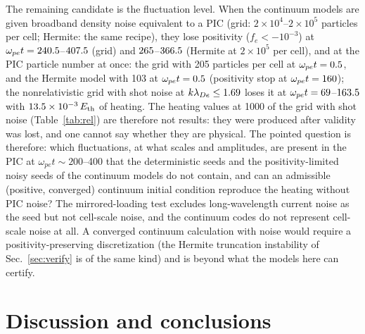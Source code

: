 \documentclass[aps,pre,reprint,floatfix,amsmath,amssymb,nofootinbib,superscriptaddress]{revtex4-2}
\newcommand{\wpe}{\omega_{pe}}
\begin{document}
The remaining candidate is the fluctuation level. When the continuum models are given broadband density noise equivalent to a PIC (grid: $2\times10^4$--$2\times10^5$ particles per cell; Hermite: the same recipe), they lose positivity ($f_e<-10^{-3}$) at $\wpe t=\shotFnegLo$--$407.5$ (grid) and $265$--$366.5$ (Hermite at $2\times10^5$ per cell), and at the PIC particle number at once: the grid with 205 particles per cell at $\wpe t=\shotFnegPic$, and the Hermite model with 103 at $\wpe t=\fTwoPpc$ (positivity stop at $\wpe t=\fTwoPpcStop$); the nonrelativistic grid with shot noise at $k\lambda_{De}\le1.69$ loses it at $\wpe t=\hkrNoLo$--$163.5$ with $13.5\times10^{-3}\,E_{\rm th}$ of heating. The heating values at 1000 of the grid with shot noise (Table~\ref{tab:rel}) are therefore not results: they were produced after validity was lost, and one cannot say whether they are physical. The pointed question is therefore: which fluctuations, at what scales and amplitudes, are present in the PIC at $\wpe t\sim200$--400 that the deterministic seeds and the positivity-limited noisy seeds of the continuum models do not contain, and can an admissible (positive, converged) continuum initial condition reproduce the heating without PIC noise? The mirrored-loading test excludes long-wavelength current noise as the seed but not cell-scale noise, and the continuum codes do not represent cell-scale noise at all. A converged continuum calculation with noise would require a positivity-preserving discretization (the Hermite truncation instability of Sec.~\ref{sec:verify} is of the same kind) and is beyond what the models here can certify.

\section{Discussion and conclusions}\label{sec:discussion}
\end{document}
